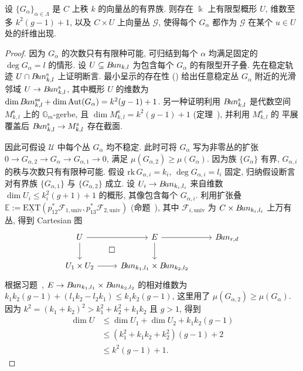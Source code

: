 \begin{lemma}\label{src:9.6.3}
设 $\{G_\alpha\}_{\alpha\in\Lambda}$ 是 $C$ 上秩 $k$ 的向量丛的有界族. 则存在 $\Bbbk$ 上有限型概形 $U$, 维数至多 $k^2(g-1)+1$, 以及 $C\times U$ 上向量丛 $\mathcal G$, 使得每个 $G_\alpha$ 都作为 $\mathcal G$ 在某个 $u\in U$ 处的纤维出现.
\end{lemma}
\begin{proof}
因为 $G_\alpha$ 的次数只有有限种可能, 可归结到每个 $\alpha$ 均满足固定的 $\deg G_\alpha=l$ 的情形. 设 $U\subseteq B\!un_{k,l}$ 为包含每个 $G_\alpha$ 的有限型开子叠. 先在稳定轨迹 $U\cap B\!un_{k,l}^{\mathrm s}$ 上证明断言. 最小呈示的存在性 () 给出任意稳定丛 $G_\alpha$ 附近的光滑邻域 $U\to B\!un_{k,l}^{\mathrm s}$, 其中概形 $U$ 的维数为 $\dim B\!un_{k,l}^{\mathrm{ss}}+\dim\operatorname{Aut}(G_\alpha)=k^2(g-1)+1$. 另一种证明利用 $B\!un_{k,l}^{\mathrm s}$ 是代数空间 $M_{k,l}^{\mathrm s}$ 上的 $\mathbb G_m$-gerbe, 且 $\dim M_{k,l}^{\mathrm s}=k^2(g-1)+1$ (定理~), 并利用 $M_{k,l}^{\mathrm s}$ 的 平展 覆盖后 $B\!un_{k,l}^{\mathrm s}\to M_{k,l}^{\mathrm s}$ 存在截面.

因此可假设 $\mathcal U$ 中每个丛 $G_\alpha$ 均不稳定. 此时可将 $G_\alpha$ 写为非零丛的扩张 $0\to G_{\alpha,2}\to G_\alpha\to G_{\alpha,1}\to0$, 满足 $\mu(G_{\alpha,2})\geq\mu(G_\alpha)$. 因为族 $\{G_\alpha\}$ 有界, $G_{\alpha,i}$ 的秩与次数只有有限种可能. 假设 $\mathrm{rk}\,G_{\alpha,i}=k_i$, $\deg G_{\alpha,i}=l_i$ 固定, 归纳假设断言对有界族 $\{G_{\alpha,1}\}$ 与 $\{G_{\alpha,2}\}$ 成立. 设 $U_i\to B\!un_{k_i,l_i}$ 来自维数 $\dim U_i\leq k_i^2(g+1)+1$ 的概形, 其像包含每个 $G_{\alpha,i}$. 利用扩张叠 $\mathbb E:=\underline{\mathrm{EXT}}(p_{12}^*\mathcal F_{1,\mathrm{univ}},p_{13}^*\mathcal F_{2,\mathrm{univ}})$ (命题~), 其中 $\mathcal F_{i,\mathrm{univ}}$ 为 $C\times B\!un_{k_i,l_i}$ 上万有丛, 得到 Cartesian 图
\[
\begin{tikzcd}[ampersand replacement=\&]
U\arrow[r]\arrow[d]\&\mathbb E\arrow[r]\arrow[d]\&\cBun_{r,d}\\
U_1\times U_2\arrow[r]\&\cBun_{k_1,l_1}\times\cBun_{k_2,l_2}\arrow[ul,phantom,"\square"]\&
\end{tikzcd}
\]
根据习题~, $E\to B\!un_{k_1,l_1}\times B\!un_{k_2,l_2}$ 的相对维数为 $k_1k_2(g-1)+(l_1k_2-l_2k_1)\leq k_1k_2(g-1)$, 这里用了 $\mu(G_{\alpha,2})\geq\mu(G_\alpha)$. 因为 $k^2=(k_1+k_2)^2>k_1^2+k_2^2+k_1k_2$ 且 $g>1$, 得到
\[
\begin{aligned}
\dim U&\leq\dim U_1+\dim U_2+k_1k_2(g-1)\\
&\leq(k_1^2+k_1k_2+k_2^2)(g-1)+2\\
&\leq k^2(g-1)+1.
\end{aligned}
\]
\end{proof}
